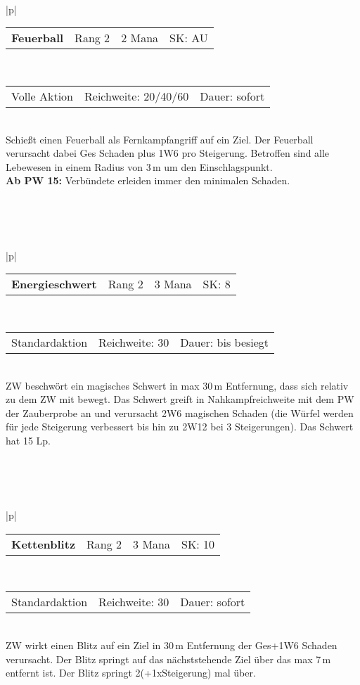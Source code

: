 \documentclass[../../Heldenanleitung2]{subfiles}
\begin{document}
\\\\\\
\begin{tabular}{|p{\textwidth}|}
\hline
\begin{tabularx}{\textwidth}{X|X|X|X}
\textbf{Feuerball} & Rang 2 & 2 Mana & SK: AU
\end{tabularx} \\ \hline
\begin{tabularx}{\textwidth}{X|X|X}
Volle Aktion & Reichweite: 20/40/60 & Dauer: sofort
\end{tabularx} \\ \hline
Schießt einen Feuerball als Fernkampfangriff auf ein Ziel. Der Feuerball verursacht dabei Ges Schaden plus 1W6 pro Steigerung. Betroffen sind alle Lebewesen in einem Radius von 3\,m um den Einschlagspunkt.\\
\textbf{Ab PW 15:} Verbündete erleiden immer den minimalen Schaden.
\\ \hline
\end{tabular}
\\\\\\
\begin{tabular}{|p{\textwidth}|}
\hline
\begin{tabularx}{\textwidth}{X|X|X|X}
\textbf{Energieschwert} & Rang 2 & 3 Mana & SK: 8
\end{tabularx} \\ \hline
\begin{tabularx}{\textwidth}{X|X|X}
Standardaktion & Reichweite: 30 & Dauer: bis besiegt
\end{tabularx} \\ \hline
ZW beschwört ein magisches Schwert in max 30\,m Entfernung, dass sich relativ zu dem ZW mit bewegt. Das Schwert greift in Nahkampfreichweite mit dem PW der Zauberprobe an und verursacht 2W6 magischen Schaden (die Würfel werden für jede Steigerung verbessert bis hin zu 2W12 bei 3 Steigerungen). Das Schwert hat 15 Lp.
\\ \hline
\end{tabular}
\\\\\\
\begin{tabular}{|p{\textwidth}|}
\hline
\begin{tabularx}{\textwidth}{X|X|X|X}
\textbf{Kettenblitz} & Rang 2 & 3 Mana & SK: 10
\end{tabularx} \\ \hline
\begin{tabularx}{\textwidth}{X|X|X}
Standardaktion & Reichweite: 30 & Dauer: sofort
\end{tabularx} \\ \hline
ZW wirkt einen Blitz auf ein Ziel in 30\,m Entfernung der Ges+1W6 Schaden verursacht. Der Blitz springt auf das nächststehende Ziel über das max 7\,m entfernt ist. Der Blitz springt 2(+1xSteigerung) mal über. 
\\ \hline
\end{tabular}
\end{document}
